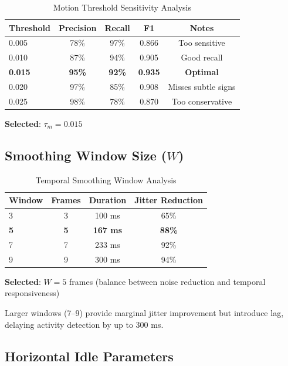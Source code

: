 \documentclass[11pt,a4paper]{article}
\begin{document}
\begin{table}[htbp]
\centering
\caption{Motion Threshold Sensitivity Analysis}
\begin{tabular}{@{}lcccc@{}}
\toprule
\textbf{Threshold} & \textbf{Precision} & \textbf{Recall} & \textbf{F1} & \textbf{Notes} \\ \midrule
0.005 & 78\% & 97\% & 0.866 & Too sensitive \\
0.010 & 87\% & 94\% & 0.905 & Good recall \\
\textbf{0.015} & \textbf{95\%} & \textbf{92\%} & \textbf{0.935} & \textbf{Optimal} \\
0.020 & 97\% & 85\% & 0.908 & Misses subtle signs \\
0.025 & 98\% & 78\% & 0.870 & Too conservative \\
\bottomrule
\end{tabular}
\end{table}

\textbf{Selected}: $\tau_m = 0.015$

\subsection{Smoothing Window Size ($W$)}

\begin{table}[htbp]
\centering
\caption{Temporal Smoothing Window Analysis}
\begin{tabular}{@{}lccc@{}}
\toprule
\textbf{Window} & \textbf{Frames} & \textbf{Duration} & \textbf{Jitter Reduction} \\ \midrule
3 & 3 & 100 ms & 65\% \\
\textbf{5} & \textbf{5} & \textbf{167 ms} & \textbf{88\%} \\
7 & 7 & 233 ms & 92\% \\
9 & 9 & 300 ms & 94\% \\
\bottomrule
\end{tabular}
\end{table}

\textbf{Selected}: $W = 5$ frames (balance between noise reduction and temporal responsiveness)

Larger windows (7--9) provide marginal jitter improvement but introduce lag, delaying activity detection by up to 300 ms.

\subsection{Horizontal Idle Parameters}
\end{document}
